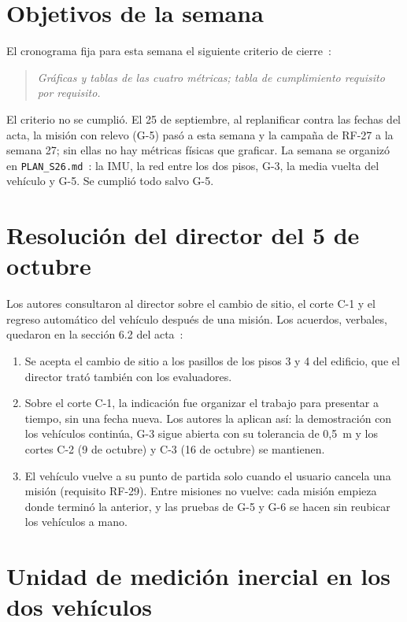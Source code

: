 \documentclass[12pt,letterpaper]{article}
\begin{document}
\section{Objetivos de la semana}

El cronograma fija para esta semana el siguiente criterio de cierre~\cite{cronograma}:

\begin{quote}
\textit{Gráficas y tablas de las cuatro métricas; tabla de cumplimiento requisito por requisito.}
\end{quote}

El criterio no se cumplió. El 25 de septiembre, al replanificar contra las fechas del acta, la misión con relevo (G-5) pasó a esta semana y la campaña de RF-27 a la semana 27; sin ellas no hay métricas físicas que graficar. La semana se organizó en \texttt{PLAN\_S26.md}~\cite{plan}: la IMU, la red entre los dos pisos, G-3, la media vuelta del vehículo y G-5. Se cumplió todo salvo G-5.

\section{Resolución del director del 5 de octubre}

Los autores consultaron al director sobre el cambio de sitio, el corte C-1 y el regreso automático del vehículo después de una misión. Los acuerdos, verbales, quedaron en la sección 6.2 del acta~\cite{acta}:

\begin{enumerate}[leftmargin=*]
    \item Se acepta el cambio de sitio a los pasillos de los pisos 3 y 4 del edificio, que el director trató también con los evaluadores.
    \item Sobre el corte C-1, la indicación fue organizar el trabajo para presentar a tiempo, sin una fecha nueva. Los autores la aplican así: la demostración con los vehículos continúa, G-3 sigue abierta con su tolerancia de 0,5~m y los cortes C-2 (9 de octubre) y C-3 (16 de octubre) se mantienen.
    \item El vehículo vuelve a su punto de partida solo cuando el usuario cancela una misión (requisito RF-29). Entre misiones no vuelve: cada misión empieza donde terminó la anterior, y las pruebas de G-5 y G-6 se hacen sin reubicar los vehículos a mano.
\end{enumerate}

\section{Unidad de medición inercial en los dos vehículos}
\end{document}
